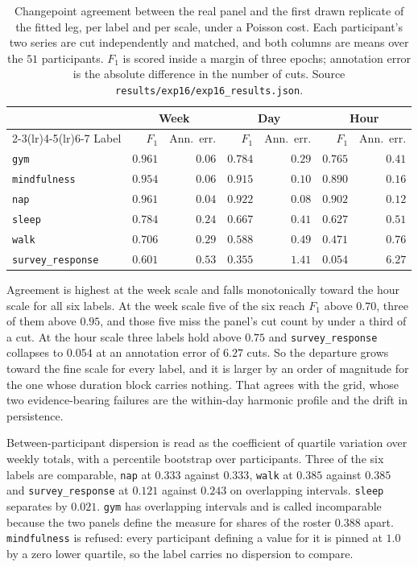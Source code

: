\begin{table}[t]
\centering
\caption{Changepoint agreement between the real panel and the first drawn
replicate of the fitted leg, per label and per scale, under a Poisson cost.
Each participant's two series are cut independently and matched, and both
columns are means over the $51$ participants. $F_1$ is scored inside a margin
of three epochs; annotation error is the absolute difference in the number of
cuts. Source \texttt{results/exp16/exp16\_results.json}.}
\label{tab:results:arm1_cuts}
\small
\begin{tabular}{lrrrrrr}
\toprule
 & \multicolumn{2}{c}{Week} & \multicolumn{2}{c}{Day} & \multicolumn{2}{c}{Hour} \\
\cmidrule(lr){2-3}\cmidrule(lr){4-5}\cmidrule(lr){6-7}
Label & $F_1$ & Ann.\ err. & $F_1$ & Ann.\ err. & $F_1$ & Ann.\ err. \\
\midrule
\texttt{gym}             & $0.961$ & $0.06$ & $0.784$ & $0.29$ & $0.765$ & $0.41$ \\
\texttt{mindfulness}     & $0.954$ & $0.06$ & $0.915$ & $0.10$ & $0.890$ & $0.16$ \\
\texttt{nap}             & $0.961$ & $0.04$ & $0.922$ & $0.08$ & $0.902$ & $0.12$ \\
\texttt{sleep}           & $0.784$ & $0.24$ & $0.667$ & $0.41$ & $0.627$ & $0.51$ \\
\texttt{walk}            & $0.706$ & $0.29$ & $0.588$ & $0.49$ & $0.471$ & $0.76$ \\
\texttt{survey\_response} & $0.601$ & $0.53$ & $0.355$ & $1.41$ & $0.054$ & $6.27$ \\
\bottomrule
\end{tabular}
\end{table}

Agreement is highest at the week scale and falls monotonically toward the hour
scale for all six labels. At the week scale five of the six reach $F_1$ above
$0.70$, three of them above $0.95$, and those five miss the panel's cut count by
under a third of a cut. At the hour scale three labels hold above $0.75$ and
\texttt{survey\_response} collapses to $0.054$ at an annotation error of $6.27$
cuts. So the departure grows toward the fine scale for every label, and it is
larger by an order of magnitude for the one whose duration block carries
nothing. That agrees with the grid, whose two evidence-bearing failures are the
within-day harmonic profile and the drift in persistence.

Between-participant dispersion is read as the coefficient of quartile
variation over weekly totals, with a percentile bootstrap over participants.
Three of the six labels are comparable, \texttt{nap} at $0.333$ against
$0.333$, \texttt{walk} at $0.385$ against $0.385$ and \texttt{survey\_response}
at $0.121$ against $0.243$ on overlapping intervals. \texttt{sleep} separates
by $0.021$. \texttt{gym} has overlapping intervals and is called incomparable
because the two panels define the measure for shares of the roster $0.388$
apart. \texttt{mindfulness} is refused: every participant defining a value for
it is pinned at $1.0$ by a zero lower quartile, so the label carries no
dispersion to compare.

